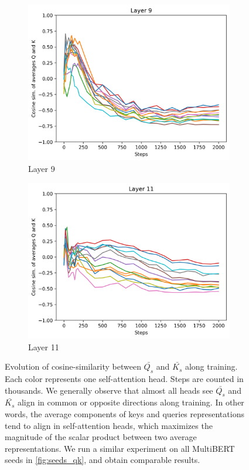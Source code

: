 \begin{figure}[ht]
\begin{subfigure}[b]{0.24\linewidth}
         \includegraphics[width=\linewidth]{sources/part_1/anisotropy/imgs/l9_cosine_QK.png}
         \caption{Layer 9}
         \label{fig:cosine_qk_l9}
    \end{subfigure}
    \begin{subfigure}[b]{0.24\linewidth}
         \includegraphics[width=\linewidth]{sources/part_1/anisotropy/imgs/l11_cosine_QK.png}
         \caption{Layer 11}
         \label{fig:cosine_qk_l11}
    \end{subfigure}
    \caption{Evolution of cosine-similarity between $\bar{Q_s}$ and $\bar{K_s}$ along training. Each color represents one self-attention head. Steps are counted in thousands. We generally observe that almost all heads see $\bar{Q_s}$ and $\bar{K_s}$ align in common or opposite directions along training. In other words, the average components of keys and queries representations tend to align in self-attention heads, which maximizes the magnitude of the scalar product between two average representations. We run a similar experiment on all MultiBERT seeds in \autoref{fig:seeds_qk}, and obtain comparable results.}
    \label{fig:cosine_qk_heads}
\end{figure}

